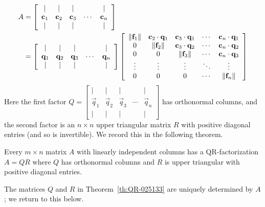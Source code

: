 \documentclass{ximera}
\begin{document}
\begin{align}
A & = \left[ \begin{array}{ccccc}
|&|&|& &| \\
\mathbf{c}_{1} & \mathbf{c}_{2} & \mathbf{c}_{3} &\cdots &  \mathbf{c}_{n}\\
|&|&|& &|
\end{array}\right] \nonumber \\
&= \left[ \begin{array}{ccccc}
|&|&|& &| \\
\mathbf{q}_{1} & \mathbf{q}_{2} & \mathbf{q}_{3} & \cdots &  \mathbf{q}_{n}\\
|&|&|& &|
\end{array}\right] \left[ \begin{array}{ccccc}
\left\lVert \mathbf{f}_{1} \right\rVert & \mathbf{c}_{2} \cdot \mathbf{q}_{1} & \mathbf{c}_{3} \cdot \mathbf{q}_{1} & \cdots & \mathbf{c}_{n} \cdot \mathbf{q}_{1} \\
0 & \left\lVert \mathbf{f}_{2} \right\rVert & \mathbf{c}_{3} \cdot \mathbf{q}_{2} & \cdots & \mathbf{c}_{n} \cdot \mathbf{q}_{2} \\
0 & 0 & \left\lVert \mathbf{f}_{3} \right\rVert & \cdots & \mathbf{c}_{n} \cdot \mathbf{q}_{3} \\
\vdots & \vdots & \vdots & \ddots & \vdots \\
0 & 0 & 0 & \cdots & \left\lVert \mathbf{f}_{n} \right\rVert
\end{array} \right] \label{matrixFactEq}
\end{align}
Here the first factor $Q = \left[ \begin{array}{ccccc}
|&|&|& &| \\
\vec{q}_{1} & \vec{q}_{2} & \vec{q}_{3} & \cdots &  \vec{q}_{n}\\
|&|&|& &|
\end{array}\right]$ has orthonormal columns, and the second factor is an $n \times n$ upper triangular matrix $R$ with positive diagonal entries (and so is invertible). We record this in the following theorem.

\begin{theorem}[QR-Factorization]\label{th:QR-025133}
Every $m \times n$ matrix $A$ with linearly independent columns has a QR-factorization $A = QR$ where $Q$ has orthonormal columns and $R$ is upper triangular with positive diagonal entries.
\end{theorem}

The matrices $Q$ and $R$ in Theorem~\ref{th:QR-025133} are uniquely determined by $A$; we return to this below.
\end{document}
